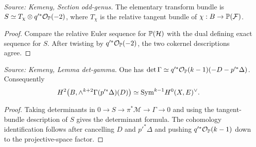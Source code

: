 \begin{lemma}
  \label{lem:kemeny_odd_S_relative_tangent}
  \textit{Source: Kemeny, Section odd-genus.}
  The elementary transform bundle is
  \(S\simeq T_\chi\otimes q'^*\mathcal{O}_{\mathbb{P}}(-2)\), where \(T_\chi\) is the relative
  tangent bundle of \(\chi:B\to\mathbb{P}(\mathcal F)\).
\end{lemma}
\begin{proof}
  Compare the relative Euler sequence for \(\mathbb{P}(\mathcal H)\) with the dual
  defining exact sequence for \(S\).  After twisting by \(q'^*\mathcal{O}_{\mathbb{P}}(-2)\),
  the two cokernel descriptions agree.
\end{proof}

\begin{lemma}
  \label{lem:kemeny_odd_det_gamma}
  \textit{Source: Kemeny, Lemma det-gamma.}
  One has
  \(\det\Gamma\simeq q'^*\mathcal{O}_{\mathbb{P}}(k-1)(-D-p'^*\Delta)\).  Consequently
  \[
    H^2\bigl(B,\wedge^{k+2}\Gamma(p'^*\Delta)(D)\bigr)
    \simeq \mathrm{Sym}^{k-1}H^0(X,E)^\vee .
  \]
\end{lemma}
\begin{proof}
  Taking determinants in \(0\to S\to\pi^*\mathcal M\to\Gamma\to0\) and using
  the tangent-bundle description of \(S\) gives the determinant formula.  The
  cohomology identification follows after cancelling \(D\) and \(p'^*\Delta\)
  and pushing \(q'^*\mathcal{O}_{\mathbb{P}}(k-1)\) down to the projective-space factor.
\end{proof}

